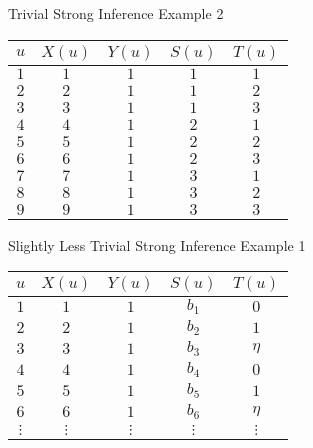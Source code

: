 \documentclass[11pt]{article}
\begin{document}
 Trivial Strong Inference Example 2 \\
 
 \begin{center}
 \begin{tabular}{ c||c|c|c|c } 

 $ u $ & $ X(u) $ & $ Y(u) $ & $ S(u) $ & $ T(u) $ \\ 
 \hline
 \hline
 $ 1 $ & $ 1 $ & $ 1 $ & $ 1 $ & $ 1 $ \\
 \hline
 $ 2 $ & $ 2 $ & $ 1 $ & $ 1 $ & $ 2 $ \\
 \hline
 $ 3 $ & $ 3 $ & $ 1 $ & $ 1 $ & $ 3 $ \\
 \hline
 $ 4 $ & $ 4 $ & $ 1 $ & $ 2 $ & $ 1 $ \\
 \hline
 $ 5 $ & $ 5 $ & $ 1 $ & $ 2 $ & $ 2 $ \\
 \hline
 $ 6 $ & $ 6 $ & $ 1 $ & $ 2 $ & $ 3 $ \\
 \hline
 $ 7 $ & $ 7 $ & $ 1 $ & $ 3 $ & $ 1 $ \\
 \hline
 $ 8 $ & $ 8 $ & $ 1 $ & $ 3 $ & $ 2 $ \\
  \hline
 $ 9 $ & $ 9 $ & $ 1 $ & $ 3 $ & $ 3 $ \\
 
 \end{tabular}
 \end{center} 
 
 Slightly Less Trivial Strong Inference Example 1
 
 \begin{center}
 \begin{tabular}{ c||c|c|c|c } 

 $ u $ & $ X(u) $ & $ Y(u) $ & $ S(u) $ & $ T(u) $ \\ 
 \hline
 \hline
 $ 1 $ & $ 1 $ & $ 1 $ & $ b_1 $ & $ 0 $ \\
 \hline
 $ 2 $ & $ 2 $ & $ 1 $ & $ b_2 $ & $ 1 $ \\
 \hline
 $ 3 $ & $ 3 $ & $ 1 $ & $ b_3 $ & $ \eta $ \\
 \hline
 $ 4 $ & $ 4 $ & $ 1 $ & $ b_4 $ & $ 0 $ \\
 \hline
 $ 5 $ & $ 5 $ & $ 1 $ & $ b_5 $ & $ 1 $ \\
 \hline
 $ 6 $ & $ 6 $ & $ 1 $ & $ b_6 $ & $ \eta $ \\
 \hline
 $ \vdots $ & $ \vdots $ & $ \vdots $ & $ \vdots $ & $ \vdots $ \\
 
 \end{tabular}
 \end{center} 
 
\end{document}
